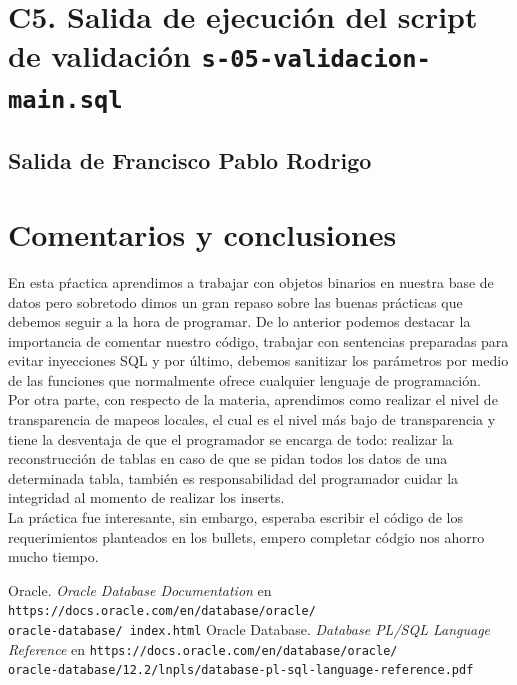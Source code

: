 \documentclass{article}
\begin{document}
\section*{C5. Salida de ejecución del script de validación 
  \texttt{s-05-validacion-main.sql}}

  \subsection*{Salida de Francisco Pablo Rodrigo}

  

\section*{Comentarios y conclusiones}

En esta pŕactica aprendimos a trabajar con objetos binarios en nuestra base
de datos pero sobretodo dimos un gran repaso sobre las buenas prácticas
que debemos seguir a la hora de programar. De lo anterior podemos destacar la
importancia de comentar nuestro código, trabajar con sentencias preparadas
para evitar inyecciones SQL y por último, debemos sanitizar los parámetros
por medio de las funciones que normalmente ofrece cualquier lenguaje de
programación.\\

Por otra parte, con respecto de la materia, aprendimos como realizar el
nivel de transparencia de mapeos locales, el cual es el nivel más bajo de 
transparencia y tiene la desventaja de que el programador se encarga de todo:
realizar la reconstrucción de tablas en caso de que se pidan todos los 
datos de una determinada tabla, también es responsabilidad del programador 
cuidar la integridad al momento de realizar los inserts.\\

La práctica fue interesante, sin embargo, esperaba escribir el código de los
requerimientos planteados en los bullets, empero completar códgio nos ahorro
mucho tiempo.

\renewcommand\refname{Bibliografía}
\begin{thebibliography}{99}
     Oracle. \textit{Oracle Database Documentation} en 
        \texttt{https://docs.oracle.com/en/database/oracle/\\oracle-database/%
        index.html}
     Oracle Database. \textit{Database PL/SQL Language 
        Reference} en 
        \texttt{https://docs.oracle.com/en/database/oracle/\\
        oracle-database/12.2/lnpls/database-pl-sql-language-reference.pdf}
\end{thebibliography}
\end{document}
